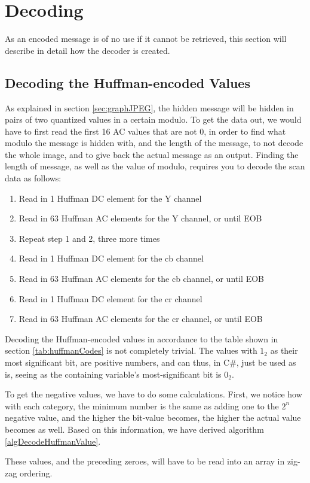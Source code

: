 \section{Decoding}
As an encoded message is of no use if it cannot be retrieved, this section will describe in detail how the decoder is created.



\subsection{Decoding the Huffman-encoded Values}
As explained in section \ref{sec:graphJPEG}, the hidden message will be hidden in pairs of two quantized values in a certain modulo.
To get the data out, we would have to first read the first 16 AC values that are not 0, in order to find what modulo the message is hidden with, and the length of the message, to not decode the whole image, and to give back the actual message as an output.
Finding the length of message, as well as the value of modulo, requires you to decode the scan data as follows:
\begin{enumerate}
	\item Read in 1 Huffman DC element for the Y channel
	\item Read in 63 Huffman AC elements for the Y channel, or until EOB
	\item Repeat step 1 and 2, three more times
	\item Read in 1 Huffman DC element for the cb channel
	\item Read in 63 Huffman AC elements for the cb channel, or until EOB
	\item Read in 1 Huffman DC element for the cr channel
	\item Read in 63 Huffman AC elements for the cr channel, or until EOB
\end{enumerate}
Decoding the Huffman-encoded values in accordance to the table shown in section \ref{tab:huffmanCodes} is not completely trivial. The values with $1_2$ as their most significant bit, are positive numbers, and can thus, in C\#, just be used as is, seeing as the containing variable's most-significant bit is $0_2$.

To get the negative values, we have to do some calculations. 
First, we notice how with each category, the minimum number is the same as adding one to the $2^n$ negative value, and the higher the bit-value becomes, the higher the actual value becomes as well. 
Based on this information, we have derived algorithm \ref{algDecodeHuffmanValue}.

These values, and the preceding zeroes, will have to be read into an array in zig-zag ordering.

